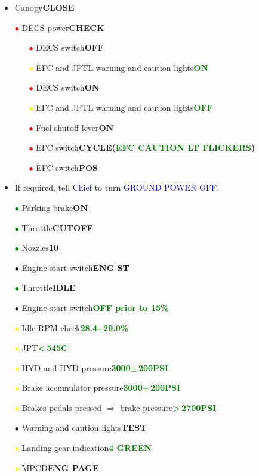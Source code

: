 \documentclass[a4paper,12pt,dvipsnames]{letter}
\newcommand{\radio}[1]{\textcolor{blue}{#1}}
\newcommand{\button}[1]{\textbf{#1}}
\newcommand{\degC}{\textdegree{}C}
\newcommand{\Deg}{\textdegree{}}
\newcommand{\ok}[1]{\textcolor{Green}{\textbf{#1}}}
\newcommand{\bi}{\textcolor{ProcessBlue}{$\bullet$\;}}
\newcommand{\ri}{\textcolor{Red}{$\bullet$\;}}
\newcommand{\gi}{\textcolor{Green}{$\bullet$\;}}
\newcommand{\yi}{\textcolor{Yellow}{$\bullet$\;}}
\begin{document}
{\begin{itemize}
\item Canopy\dotfill\button{CLOSE}
\item[\ri] DECS power\dotfill\button{CHECK}
\begin{itemize}
 \item[\ri] DECS switch\dotfill\button{OFF}
 \item[\yi] EFC and JPTL warning and caution lights\dotfill\ok{ON}
 \item[\ri] DECS switch\dotfill\button{ON}
 \item[\yi] EFC and JPTL warning and caution lights\dotfill\ok{OFF}
 \item[\ri] Fuel shutoff lever\dotfill\button{ON}
 \item[\ri] EFC switch\dotfill\button{CYCLE\;(\ok{EFC CAUTION LT FLICKERS})}
 \item[\ri] EFC switch\dotfill\button{POS}
\end{itemize}
\item If required, tell \radio{Chief} to turn \radio{GROUND POWER OFF}.
\item[\gi] Parking brake\dotfill\button{ON}
\item[\gi] Throttle\dotfill\button{CUTOFF}
\item[\gi] Nozzles\dotfill\button{10\Deg}
\item[\bi] Engine start switch\dotfill\button{ENG ST}
\item[\gi] Throttle\dotfill\button{IDLE}
\item[\bi] Engine start switch\dotfill\ok{OFF prior to 15\%}
\item[\yi] Idle RPM check\dotfill\ok{28.4\,-\,29.0\%}
\item[\yi] JPT\dotfill\ok{<\,545\degC}
\item[\yi] HYD and HYD pressure\dotfill\ok{3000\;$\pm$\,200\;PSI}
\item[\yi] Brake accumulator pressure\dotfill\ok{3000\;$\pm$\,200\;PSI}
\item[\yi] Brakes pedals pressed $\Rightarrow$ brake pressure\dotfill\ok{>\,2700\;PSI}
\item[\bi] Warning and caution lights\dotfill\button{TEST}
\item[\yi] Landing gear indication\dotfill\ok{4 GREEN}
\item[\yi] MPCD\dotfill\button{ENG PAGE}

\end{itemize}}
\end{document}
